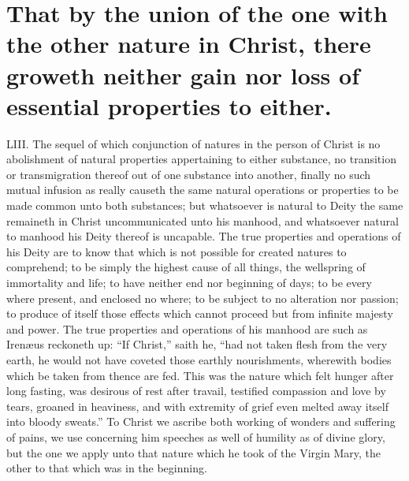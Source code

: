 \section*{That by the union of the one with the other nature in Christ, there groweth neither gain nor loss of essential properties to either.}
LIII. The sequel of which conjunction of natures in the person of Christ is no abolishment of natural properties appertaining to either substance, no transition or transmigration thereof out of one substance into another, finally no such mutual infusion as really causeth the same natural operations or properties to be made common unto both substances; but whatsoever is natural to Deity the same remaineth in Christ uncommunicated unto his manhood, and whatsoever natural to manhood his Deity thereof is uncapable. The true properties and operations of his Deity are to know that which is not possible for created natures to comprehend; to be simply the highest cause of all things, the wellspring of immortality and life; to have neither end nor beginning of days; to be every where present, and enclosed no where; to be subject to no alteration nor passion; to produce of itself those effects which cannot proceed but from infinite majesty and power. The true properties and operations of his manhood are such as Irenæus reckoneth up: “If Christ,” saith he, “had not taken flesh  from the very earth, he would not have coveted those earthly nourishments, wherewith bodies which be taken from thence are fed. This was the nature which felt hunger after long fasting, was desirous of rest after travail, testified compassion and love by tears, groaned in heaviness, and with extremity of grief even melted away itself into bloody sweats.” To Christ we ascribe both working of wonders and suffering of pains, we use concerning him speeches as well of humility as of divine glory, but the one we apply unto that nature which he took of the Virgin Mary, the other to that which was in the beginning.
